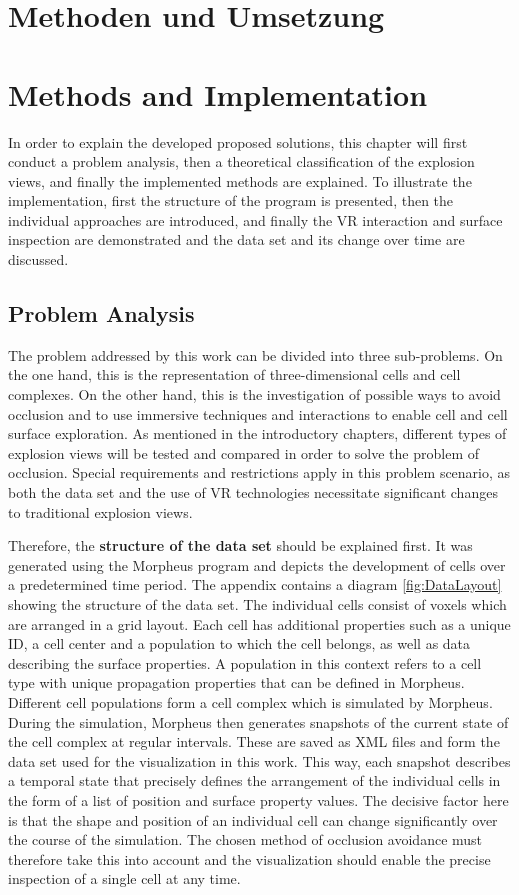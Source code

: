 {\chapter{Methoden und Umsetzung}}
{\chapter{Methods and Implementation}}
\label{sec:methods}


In order to explain the developed proposed solutions, this chapter will first conduct a problem analysis, then a theoretical classification of the explosion views, and finally the implemented methods are explained. 
To illustrate the implementation, first the structure of the program is presented, then the individual approaches are introduced, and finally the VR interaction and surface inspection are demonstrated and the data set and its change over time are discussed.

\section{Problem Analysis}
The problem addressed by this work can be divided into three sub-problems. On the one hand, this is the representation of three-dimensional cells and cell complexes. On the other hand, this is the investigation of possible ways to avoid occlusion and to use immersive techniques and interactions to enable cell and cell surface exploration.
As mentioned in the introductory chapters, different types of explosion views will be tested and compared in order to solve the problem of occlusion.
Special requirements and restrictions apply in this problem scenario, as both the data set and the use of VR technologies necessitate significant changes to traditional explosion views.

Therefore, the \textbf{structure of the data set} should be explained first.
It was generated using the Morpheus program and depicts the development of cells over a predetermined time period.
The appendix contains a diagram \ref{fig:DataLayout} showing the structure of the data set.
The individual cells consist of voxels which are arranged in a grid layout. Each cell has additional properties such as a unique ID, a cell center and a population to which the cell belongs, as well as data describing the surface properties. 
A population in this context refers to a cell type with unique propagation properties that can be defined in Morpheus.
Different cell populations form a cell complex which is simulated by Morpheus. 
During the simulation, Morpheus then generates snapshots of the current state of the cell complex at regular intervals. 
These are saved as XML files and form the data set used for the visualization in this work. 
This way, each snapshot describes a temporal state that precisely defines the arrangement of the individual cells in the form of a list of position and surface property values.
The decisive factor here is that the shape and position of an individual cell can change significantly over the course of the simulation. 
The chosen method of occlusion avoidance must therefore take this into account and the visualization should enable the precise inspection of a single cell at any time.

